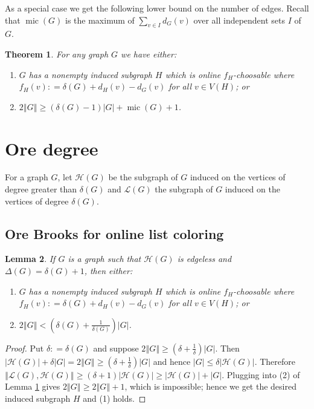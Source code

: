 \documentclass[12pt]{article}
\theoremstyle{plain}
\newtheorem{thm}{Theorem}[section]
\newtheorem{lem}[thm]{Lemma}
\theoremstyle{definition}
\theoremstyle{remark}
\newcommand{\fancy}[1]{\mathcal{#1}}
\renewcommand{\L}{\fancy{L}}
\newcommand{\HH}{\fancy{H}}
\newcommand{\card}[1]{\left|#1\right|}
\newcommand{\size}[1]{\left\Vert#1\right\Vert}
\newcommand{\parens}[1]{\left( #1 \right)}
\newcommand{\DefinedAs}{\mathrel{\mathop:}=}
\newcommand{\mic}{\operatorname{mic}}
\begin{document}
As a special case we get the following lower bound on the number of edges.  Recall that $\mic(G)$ is the maximum of $\sum_{v \in I} d_G(v)$ over all independent sets $I$ of $G$.

\begin{thm}\label{ConsantListMicStrength}
For any graph $G$ we have either:
\begin{enumerate}
\item $G$ has a nonempty induced subgraph $H$ which is online $f_H$-choosable where $f_H(v) \DefinedAs \delta(G) + d_H(v) - d_G(v)$ for all $v \in V(H)$; or
\item $2\size{G} \geq (\delta(G) - 1)\card{G} + \mic(G) + 1$.
\end{enumerate}
\end{thm}

\section{Ore degree}
For a graph $G$, let $\HH(G)$ be the subgraph of $G$ induced on the vertices of degree greater than $\delta(G)$ and $\L(G)$ the subgraph of $G$ induced on the vertices of degree $\delta(G)$.

\subsection{Ore Brooks for online list coloring}
\begin{lem}\label{OrePrecursor1}
If $G$ is a graph such that $\HH(G)$ is edgeless and $\Delta(G) = \delta(G) + 1$, then either:
\begin{enumerate}
\item $G$ has a nonempty induced subgraph $H$ which is online $f_H$-choosable where $f_H(v) \DefinedAs \delta(G) + d_H(v) - d_G(v)$ for all $v \in V(H)$; or
\item $2\size{G} < \parens{\delta(G) + \frac{1}{\delta(G)}}\card{G}$.
\end{enumerate}
\end{lem}
\begin{proof}
Put $\delta \DefinedAs \delta(G)$ and suppose $2\size{G} \geq \parens{\delta + \frac{1}{\delta}}\card{G}$.  Then $\card{\HH(G)} + \delta\card{G} = 2\size{G} \geq \parens{\delta + \frac{1}{\delta}}\card{G}$ and hence $\card{G} \leq \delta\card{\HH(G)}$.  Therefore $\size{\L(G), \HH(G)} \geq (\delta + 1)\card{\HH(G)} \geq \card{\HH(G)} + \card{G}$.  Plugging into (2) of Lemma \ref{ConsantListMicStrength} gives $2\size{G} \geq 2\size{G} + 1$, which is impossible; hence we get the desired induced subgraph $H$ and (1) holds.
\end{proof}
\end{document}
